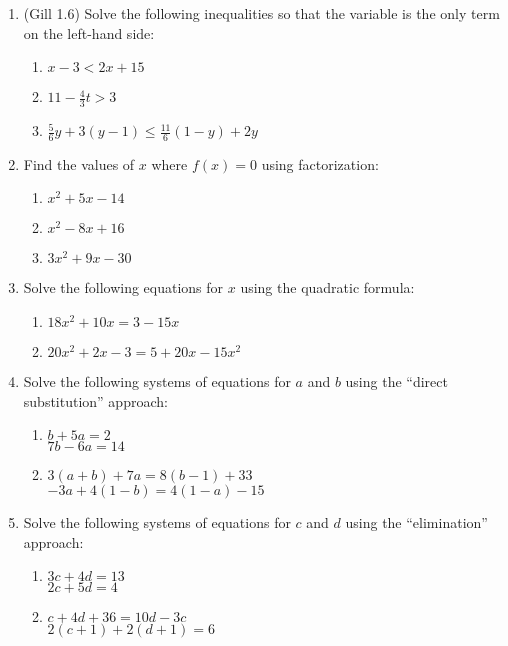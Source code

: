 \documentclass[11pt]{article}
\begin{document}
\begin{enumerate}
\item (Gill 1.6) Solve the following inequalities so that the variable is the only term on the left-hand side:
\begin{enumerate}
\item $x - 3 < 2x + 15$  %
\item $11 - \frac{4}{3}t > 3$  %
\item $\frac{5}{6}y + 3(y-1) \leq \frac{11}{6}(1-y) + 2y$  %
\end{enumerate}


\item Find the values of $x$ where $f(x)=0$ using factorization:
\begin{enumerate}
\item $x^2 + 5x - 14$ %
\item $x^2 - 8x + 16$ %
\item $3x^2 + 9x - 30$ %
\end{enumerate}


\item Solve the following equations for $x$ using the quadratic formula:
\begin{enumerate}
\item $18x^2 + 10x = 3 - 15x$ %
\item $20x^2 + 2x - 3 = 5 + 20x - 15x^2$ %
\end{enumerate}


\item Solve the following systems of equations for $a$ and $b$ using the ``direct substitution'' approach:
\begin{enumerate}
\item $b + 5a = 2$ \\ $7b - 6a = 14$ %
\item $3(a+b) + 7a = 8(b-1) + 33$ \\ $-3a + 4(1-b) = 4(1-a) - 15$ %
\end{enumerate}



\item Solve the following systems of equations for $c$ and $d$ using the ``elimination'' approach:
\begin{enumerate}
\item $3c + 4d = 13$ \\ $2c + 5d = 4$ %
\item $c + 4d + 36 = 10d - 3c$ \\ $2(c+1) + 2(d+1) = 6$ %
\end{enumerate}



\end{enumerate}
\end{document}
